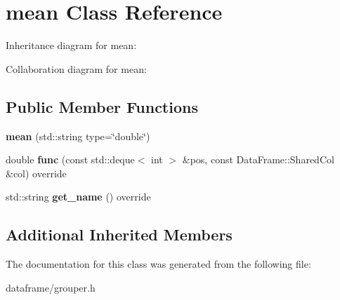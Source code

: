 \hypertarget{classmean}{}\section{mean Class Reference}
\label{classmean}


Inheritance diagram for mean\+:


Collaboration diagram for mean\+:
\subsection*{Public Member Functions}
\begin{DoxyCompactItemize}
\item 
\mbox{\label{classmean_ad564c130074cfd930dc03123f3de308c}} 
{\bfseries mean} (std\+::string type=\char`\"{}double\char`\"{})
\item 
\mbox{\label{classmean_aaf79a8b64ea62ed54cb46e1489702491}} 
double {\bfseries func} (const std\+::deque$<$ int $>$ \&pos, const Data\+Frame\+::\+Shared\+Col \&col) override
\item 
\mbox{\label{classmean_acbdb3b85d60c1fd182f752ace5dc356d}} 
std\+::string {\bfseries get\+\_\+name} () override
\end{DoxyCompactItemize}
\subsection*{Additional Inherited Members}


The documentation for this class was generated from the following file\+:\begin{DoxyCompactItemize}
\item 
dataframe/grouper.\+h\end{DoxyCompactItemize}

